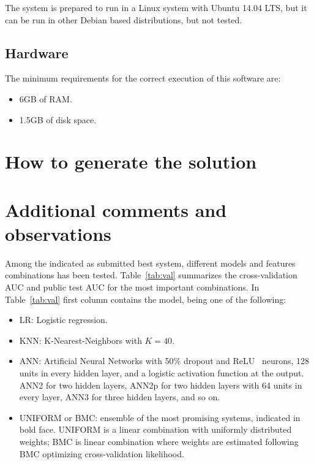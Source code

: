 \documentclass[a4paper,english,twoside]{article}
\begin{document}
The system is prepared to run in a Linux system with Ubuntu 14.04 LTS, but it
can be run in other Debian based distributions, but not tested.

\subsection{Hardware}\label{hardware}

The minimum requirements for the correct execution of this software are:

\begin{itemize}
\item
  6GB of RAM.
\item
  1.5GB of disk space.
\end{itemize}

\section{How to generate the
  solution}\label{how-to-generate-the-solution}

\section{Additional comments and
  observations}\label{additional-comments-and-observations}

Among the indicated as submitted best system, different models and
features combinations has been tested. Table~\ref{tab:val} summarizes
the cross-validation AUC and public test AUC for the most important
combinations. In Table~\ref{tab:val} first column contains the model, being one
of the following:

\begin{itemize}
\item
  LR: Logistic regression.
\item
  KNN: K-Nearest-Neighbors with $K=40$.
\item ANN: Artificial Neural Networks with 50\% dropout and
  ReLU~\cite{2011:glorot:aistats} neurons, 128 units in every hidden layer, and
  a logistic activation function at the output.  ANN2 for two hidden layers,
  ANN2p for two hidden layers with 64 units in every layer, ANN3 for three
  hidden layers, and so on.
\item
  UNIFORM or BMC: ensemble of the most promising systems, indicated in
  bold face. UNIFORM is a linear combination with uniformly distributed
  weights; BMC is linear combination where weights are estimated
  following BMC optimizing cross-validation likelihood.
\end{itemize}
\end{document}
